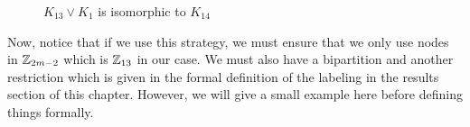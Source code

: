 \begin{figure}[H]
\begin{center}
  \end{center}
  \caption{$K_{13}\vee K_{1}$ is isomorphic to $K_{14}$}
  \label{fig:K13infty}
\end{figure}

  

Now, notice that if we use this strategy, we must ensure that we only use nodes in $\mathbb{Z}_{2m-2}$ which is $\mathbb{Z}_{13}$ in our case. We must also have a bipartition and another restriction which is given in the formal definition of the labeling in the results section of this chapter. However, we will give a small example here before defining things formally.

